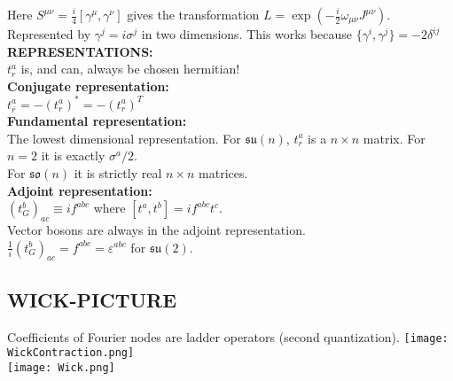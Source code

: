 \documentclass[a4paper, norsk, 8pt, landscape]{article}
\begin{document}
\begin{multicols*}{3}
Here $S^{\mu\nu}=\frac{i}{4}[\gamma^\mu,\gamma^\nu]$ gives the transformation
$L = \exp \left(-\frac{i}{2}\omega_{\mu\nu}J^{\mu\nu}\right)$. Represented by $\gamma^{j}=i\sigma^{j}$
in two dimensions. This works because $\{\gamma^i, \gamma^j \}=-2\delta^{ij}$
\\
 {\textbf{REPRESENTATIONS:}} \\
$t_r^a$ is, and can, always be chosen hermitian! \\
 {\textbf{Conjugate representation:}} \\
$t_{\overline{r}}^a = -(t_r^a)^* = -(t_r^a)^T$ \\
 {\textbf{Fundamental representation:}} \\
The lowest dimensional representation. For $\mathfrak{su}(n)$, $t_r^a$ is a $n\times n$ matrix.
For $n=2$ it is exactly $\sigma^a /2$. \\
For $\mathfrak{so}(n)$ it is strictly real $n\times n$ matrices.
\\
 {\textbf{Adjoint representation:}} \\
$(t_G^b)_{ac} \equiv if^{abc}$ where $[t^a,t^b]=if^{abc}t^c$. \\
Vector bosons are always in the adjoint representation. \\
$\frac{1}{i}(t_G^b)_{ac}=f^{abc}=\varepsilon^{abc}$ for $\mathfrak{su}(2)$.


















\subsection*{\small  WICK-PICTURE}
Coefficients of Fourier nodes are ladder operators (second quantization).
\texttt{[image: WickContraction.png]} \\
\texttt{[image: Wick.png]}


















\end{multicols*}
\end{document}
